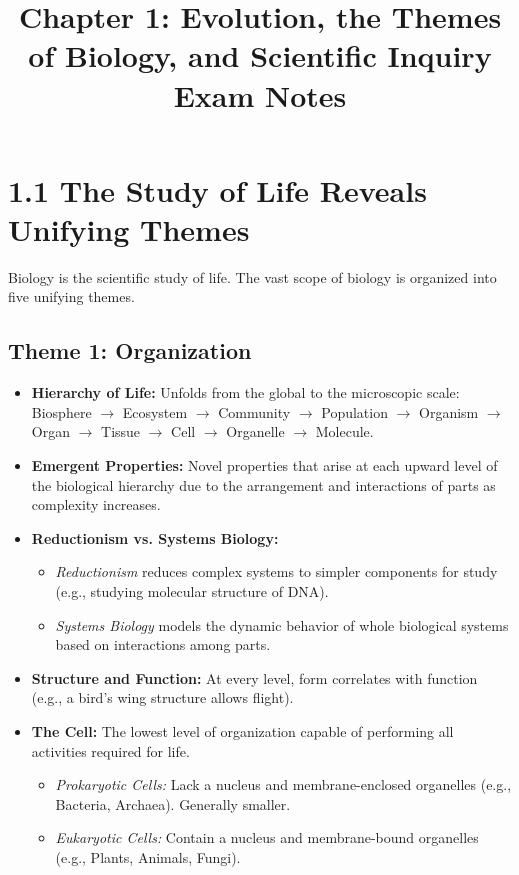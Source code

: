 \documentclass[11pt, a4paper]{article}
\title{\textbf{Chapter 1: Evolution, the Themes of Biology, and Scientific Inquiry \\ Exam Notes}}
\author{}
\date{}
\begin{document}
\maketitle

\section*{1.1 The Study of Life Reveals Unifying Themes}
Biology is the scientific study of life. The vast scope of biology is organized into five unifying themes.

\subsection*{Theme 1: Organization}
\begin{itemize}
    \item \textbf{Hierarchy of Life:} Unfolds from the global to the microscopic scale: Biosphere $\rightarrow$ Ecosystem $\rightarrow$ Community $\rightarrow$ Population $\rightarrow$ Organism $\rightarrow$ Organ $\rightarrow$ Tissue $\rightarrow$ Cell $\rightarrow$ Organelle $\rightarrow$ Molecule.
    \item \textbf{Emergent Properties:} Novel properties that arise at each upward level of the biological hierarchy due to the arrangement and interactions of parts as complexity increases.
    \item \textbf{Reductionism vs. Systems Biology:} 
    \begin{itemize}
        \item \textit{Reductionism} reduces complex systems to simpler components for study (e.g., studying molecular structure of DNA). 
        \item \textit{Systems Biology} models the dynamic behavior of whole biological systems based on interactions among parts.
    \end{itemize}
    \item \textbf{Structure and Function:} At every level, form correlates with function (e.g., a bird's wing structure allows flight).
    \item \textbf{The Cell:} The lowest level of organization capable of performing all activities required for life.
    \begin{itemize}
        \item \textit{Prokaryotic Cells:} Lack a nucleus and membrane-enclosed organelles (e.g., Bacteria, Archaea). Generally smaller.
        \item \textit{Eukaryotic Cells:} Contain a nucleus and membrane-bound organelles (e.g., Plants, Animals, Fungi).
    \end{itemize}
\end{itemize}
\end{document}
